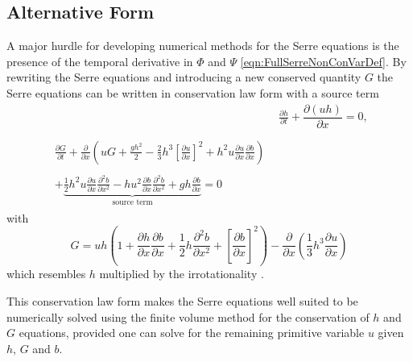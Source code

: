 \subsection{Alternative Form}
A major hurdle for developing numerical methods for the Serre equations is the presence of the temporal derivative in $\Phi$ and $\Psi$ \eqref{eqn:FullSerreNonConVarDef}. By rewriting the Serre equations and introducing a new conserved quantity $G$ \cite{Hank-etal-2010-2034,Zoppou-2014,Li-2014-169} the Serre equations can be written in conservation law form with a source term
\begin{subequations}
	\label{eqn:FullSerreCon}
	\begin{align}
	& \frac{\partial h}{\partial t} + \dfrac{\partial (uh)}{\partial x} = 0 ,\label{eqn:FullSerreConMass}  \\ \nonumber \\
	\begin{split}
	\label{eqn:Serreconsconmom}
	\frac{\partial G}{\partial t}  + \frac{\partial}{\partial x} \left( {u} G + \frac{gh^2}{2} - \frac{2}{3}h^3 \left[\frac{\partial {u}}{\partial x}\right]^2 + h^2 {u}\frac{\partial {u}}{\partial x}\frac{\partial b}{\partial x} \right) \\ \\ +  \underbrace{\frac{1}{2}h^2 {u} \frac{\partial {u}}{\partial x} \frac{\partial^2 b}{\partial x^2}  - h {u}^2\frac{\partial b}{\partial x}\frac{\partial^2 b}{\partial x^2} + gh\frac{\partial b}{\partial x} } _{\text{source term}} = 0
	\end{split}
	\end{align}
\end{subequations}
with
\begin{equation}
\label{defn:SerreEqnConservedQuantity1}
G =  {u}h \left(1 + \frac{\partial h}{\partial x}\frac{\partial b}{\partial x} + \frac{1}{2}h\frac{\partial^2 b}{\partial x^2} + \left[\frac{\partial b}{\partial x}\right]^2 \right) - \frac{\partial}{\partial x}\left(\frac{1}{3}h^3  \frac{\partial {u}}{\partial x}\right)
\end{equation}
which resembles $h$ multiplied by the irrotationality \cite{Choi-Camassa-1999-1,Carter-Cienfuegos-2011-259}.

This conservation law form makes the Serre equations well suited to be numerically solved using the finite volume method for the conservation of $h$ and $G$ equations, provided one can solve for the remaining primitive variable $u$ given $h$, $G$ and $b$.

